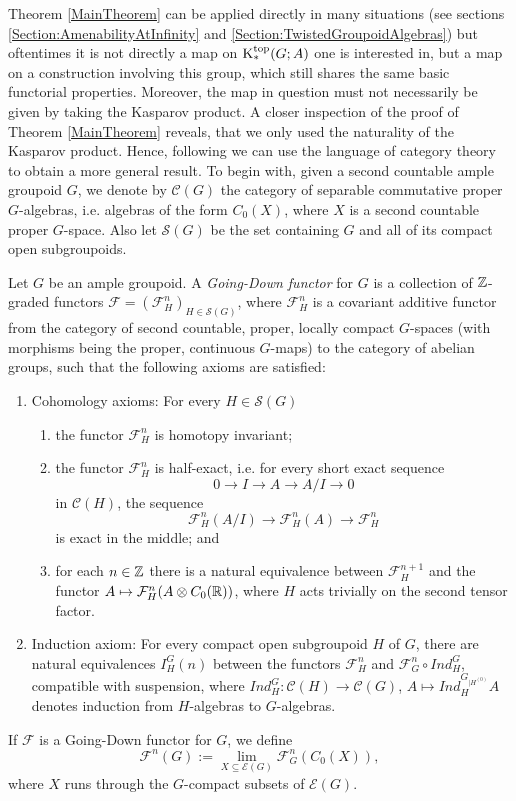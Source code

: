	Theorem \ref{MainTheorem} can be applied directly in many situations (see sections \ref{Section:AmenabilityAtInfinity} and \ref{Section:TwistedGroupoidAlgebras}) but oftentimes it is not directly a map on $\mathrm K_*^{\mathrm{top}}(G;A)$ one is interested in, but a map on a construction involving this group, which still shares the same basic functorial properties.
	Moreover, the map in question must not necessarily be given by taking the Kasparov product. A closer inspection of the proof of Theorem \ref{MainTheorem} reveals, that we only used the naturality of the Kasparov product. Hence, following \cite{CEO} we can use the language of category theory to obtain a more general result.
	To begin with, given a second countable ample groupoid $G$, we denote by $\mathcal{C}(G)$ the category of separable commutative proper $G$-algebras, i.e. algebras of the form $C_0(X)$, where $X$ is a second countable proper $G$-space. Also let $\mathcal{S}(G)$ be the set containing $G$ and all of its compact open subgroupoids.
	\begin{defi}\label{Def:GDfunctor} Let $G$ be an ample groupoid.
		A \textit{Going-Down functor} for $G$ is a collection of $\mathbb Z$-graded functors $\mathcal{F}=(\mathcal{F}^n_H)_{H\in \mathcal{S}(G)}$, where $\mathcal{F}^n_{H}$ is a covariant additive functor from the category of second countable, proper, locally compact $G$-spaces (with morphisms being the proper, continuous $G$-maps) to the category of abelian groups, such that the following axioms are satisfied:
		\begin{enumerate}
			\item Cohomology axioms: For every $H\in \mathcal{S}(G)$
			\begin{enumerate}
				\item the functor $\mathcal{F}_H^n$ is homotopy invariant;
				\item the functor $\mathcal{F}_H^n$ is half-exact, i.e. for every short exact sequence $$0\longrightarrow I\longrightarrow A\longrightarrow A/I\longrightarrow 0$$
				in $\mathcal{C}(H)$, the sequence
				$$\mathcal{F}_H^n (A/I)\longrightarrow \mathcal{F}_H^n(A)\longrightarrow\mathcal{F}_H^n$$
				is exact in the middle; and 
				\item for each $n\in\mathbb Z$ there is a natural equivalence between $\mathcal{F}_H^{n+1}$ and the functor $A\mapsto \mathcal{F}_H^n(A\otimes C_0(\mathbb R))$, where $H$ acts trivially on the second tensor factor.
			\end{enumerate}
			\item Induction axiom: For every compact open subgroupoid $H$ of $G$, there are natural equivalences $I_H^G(n)$ between the functors $\mathcal{F}_H^n$ and $\mathcal{F}_G^n\circ Ind_H^G$, compatible with suspension,
			where $Ind_H^G:\mathcal{C}(H)\rightarrow \mathcal{C}(G)$, $A\mapsto Ind_H^{G_{\mid H^{(0)}}} A$ denotes induction from $H$-algebras to $G$-algebras.
		\end{enumerate}
		If $\mathcal{F}$ is a Going-Down functor for $G$, we define $$\mathcal{F}^n(G):=\lim\limits_{X\subseteq \mathcal{E}(G)}\mathcal{F}^n_G(C_0(X)),$$
		where $X$ runs through the $G$-compact subsets of $\mathcal{E}(G)$.
	\end{defi}
